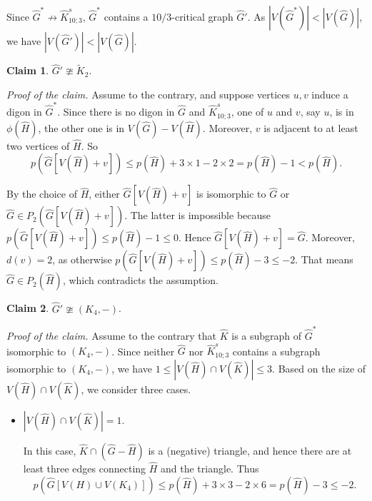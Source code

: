 \documentclass[11pt,a4paper]{article}
\makeatletter
\renewenvironment{proof}[1][\proofname]{\par
	\pushQED{\qed}%
	\normalfont \topsep6\p@\@plus6\p@\relax
	\trivlist
	\item[\hskip\labelsep
	\bfseries
	#1\@addpunct{.}]\ignorespaces
}{%
	\popQED\endtrivlist\@endpefalse
}
\theoremstyle{definition}
\newtheorem{claim}{Claim}
\makeatother
\begin{document}
\begin{proof}
	
	Since  $\widehat{G}^*\not\to \widehat{K}^s_{10;3}$, $\widehat{G}^*$ contains a $10/3$-critical graph $\widehat{G}'$. As $|V(\widehat{G}^*)|<|V(\widehat{G})|$, we have $|V(\widehat{G}')|<|V(\widehat{G})|$. 
	
	
	
	\begin{claim}\label{clm:digon}
		$\widehat{G}'\ncong \widetilde{K}_2$.
	\end{claim}
	
	\noindent\emph{Proof of the claim.} Assume to the contrary, and suppose vertices $u, v$ induce a digon in $\widehat{G}^*$. Since there is no digon in $\widehat{G}$ and $\widehat{K}^s_{10;3}$, one of $u$ and $v$, say $u$, is in $\phi(\widehat{H})$, the other one is in $V(\widehat{G})-V(\widehat{H})$. Moreover, $v$ is adjacent to at least two vertices of $\widehat{H}$. So $$p(\widehat{G}[V(\widehat{H})+v])\leq p(\widehat{H})+3\times 1-2 \times 2=p(\widehat{H})-1<p(\widehat{H}) .$$
	
	By the choice of $\widehat{H}$,  either $\widehat{G}[V(\widehat{H})+v]$ is isomorphic to $\widehat{G}$ or $\widehat{G}\in P_2(\widehat{G}[V(\widehat{H})+v])$. The latter is impossible because $p(\widehat{G}[V(\widehat{H})+v])\leq p(\widehat{H})-1\leq 0$. Hence $\widehat{G}[V(\widehat{H})+v]=\widehat{G}$. Moreover, $d(v)=2$, as otherwise $p(\widehat{G}[V(\widehat{H})+v])\leq p(\widehat{H})-3\leq -2$. That means $\widehat{G}\in P_2(\widehat{H})$, which contradicts the assumption.  
	
	
	\begin{claim}\label{clm:K_4}
		$\widehat{G}'\ncong (K_4,-)$.
	\end{claim}
	
	\noindent\emph{Proof of the claim.} Assume to the contrary that $\widehat{K}$ is a subgraph of  $\widehat{G}^*$ isomorphic to $(K_4,-)$. Since neither $\widehat{G}$ nor $\widehat{K}^s_{10;3}$ contains a subgraph isomorphic to $(K_4,-)$, we have $1\leq |V(\widehat{H}) \cap V(\widehat{K})|\leq 3$. Based on the size of $V(\widehat{H}) \cap V(\widehat{K})$, we consider three cases.
	\begin{itemize}
		\item[(1)] $|V(\widehat{H}) \cap V(\widehat{K})|=1$.
		
		In this case, $\widehat{K}\cap (\widehat{G}-\widehat{H})$  is a (negative) triangle, and hence there are at least three edges connecting $\widehat{H}$ and the triangle. Thus 
		$$p(\widehat{G}[V(H)\cup V(K_4)])\leq p(\widehat{H})+3\times 3-2\times 6=p(\widehat{H})-3\leq -2.$$ 
		

\end{itemize}
\end{proof}
\end{document}
